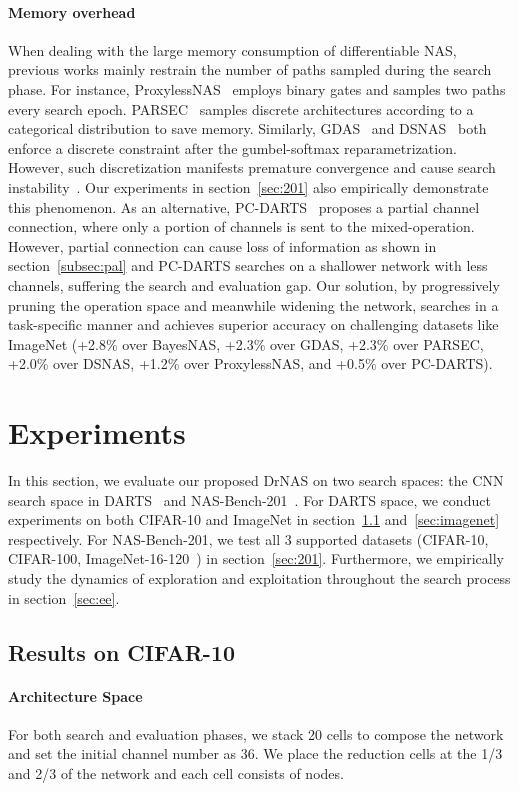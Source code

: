 \documentclass{article} \usepackage{iclr2021_conference,times}
\begin{document}
\paragraph{Memory overhead} When dealing with the large memory consumption of differentiable NAS, previous works mainly restrain the number of paths sampled during the search phase.
For instance, ProxylessNAS~\citep{proxylessnas} employs binary gates and samples two paths every search epoch.
PARSEC~\citep{parsec} samples discrete architectures according to a categorical distribution to save memory.  
Similarly, GDAS~\citep{gdas} and DSNAS~\citep{dsnas} both enforce a discrete constraint after the gumbel-softmax reparametrization. However, such discretization manifests premature convergence and cause search instability~\citep{nasbench1shot1, mmf}. Our experiments in section~\ref{sec:201} also empirically demonstrate this phenomenon. 
As an alternative, PC-DARTS~\citep{pcdarts} proposes a partial channel connection, where only a portion of channels is sent to the mixed-operation.
However, partial connection can cause loss of information as shown in section~\ref{subsec:pal} and PC-DARTS searches on a shallower network with less channels, suffering the search and evaluation gap.
Our solution, by progressively pruning the operation space and meanwhile widening the network, searches in a task-specific manner and achieves superior accuracy on challenging datasets like ImageNet (+2.8\% over BayesNAS, +2.3\% over GDAS, +2.3\% over PARSEC, +2.0\% over DSNAS, +1.2\% over ProxylessNAS, and +0.5\% over PC-DARTS).


\section{Experiments}
In this section, we evaluate our proposed DrNAS on two search spaces: the CNN search space in DARTS~\citep{darts} and NAS-Bench-201~\citep{nasbench201}. For DARTS space, we conduct experiments on both CIFAR-10 and ImageNet in section~\ref{sec:cifar10} and~\ref{sec:imagenet} respectively. For NAS-Bench-201, we test all 3 supported datasets (CIFAR-10, CIFAR-100, ImageNet-16-120~\citep{imagenet16}) in section~\ref{sec:201}. Furthermore, we empirically study the dynamics of exploration and exploitation throughout the search process in section~\ref{sec:ee}.
\subsection{Results on CIFAR-10}
\label{sec:cifar10}
\paragraph{Architecture Space}
For both search and evaluation phases, we stack 20 cells to compose the network and set the initial channel number as 36. We place the reduction cells at the 1/3 and 2/3 of the network and each cell consists of  nodes. 
\end{document}
